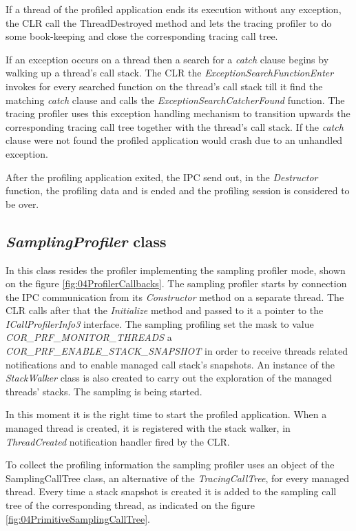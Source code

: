 If a thread of the profiled application ends its execution without any exception, the CLR call the ThreadDestroyed method and lets the tracing profiler to do some book-keeping and close the corresponding tracing call tree.

If an exception occurs on a thread then a search for a \textit{catch} clause begins by walking up a thread's call stack. The CLR the \textit{ExceptionSearchFunctionEnter} invokes for every searched function on the thread's call stack till it find the matching \textit{catch} clause and calls the \textit{ExceptionSearchCatcherFound} function. The tracing profiler uses this exception handling mechanism to transition upwards the corresponding tracing call tree together with the thread's call stack. If the \textit{catch} clause were not found the profiled application would crash due to an unhandled exception.
 
After the profiling application exited, the IPC send out, in the \textit{Destructor} function, the profiling data and is ended and the profiling session is considered to be over.


\subsection{\textit{SamplingProfiler} class}
In this class resides the profiler implementing the sampling profiler mode, shown on the figure \ref{fig:04ProfilerCallbacks}. The sampling profiler starts by connection the IPC communication from its \textit{Constructor} method on a separate thread. The CLR calls after that the \textit{Initialize} method and passed to it a pointer to the \textit{ICallProfilerInfo3} interface. The sampling profiling set the mask to value \textit{COR\_PRF\_MONITOR\_THREADS} a \textit{COR\_PRF\_ENABLE\_STACK\_SNAPSHOT} in order to receive threads related notifications and to enable managed call stack's snapshots. An instance of the \textit{StackWalker} class is also created to carry out the exploration of the managed threads' stacks. The sampling is being started.

In this moment it is the right time to start the profiled application. When a managed thread is created, it is registered with the stack walker, in \textit{ThreadCreated} notification handler fired by the CLR.

To collect the profiling information the sampling profiler uses an object of the SamplingCallTree class, an alternative of the \textit{TracingCallTree}, for every managed thread. Every time a stack snapshot is created it is added to the sampling call tree of the corresponding thread, as indicated on the figure \ref{fig:04PrimitiveSamplingCallTree}. 

